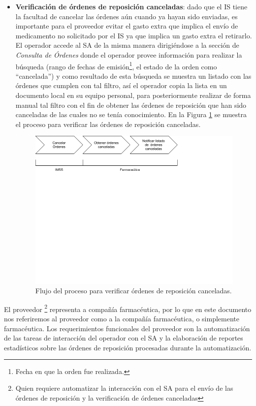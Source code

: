 \documentclass[letterpaper,11pt]{article}
\begin{document}
\begin{itemize}
\item \textbf{Verificación de órdenes de reposición canceladas}: dado que el IS tiene la facultad de cancelar las órdenes aún cuando ya hayan sido enviadas, es importante para el proveedor evitar el gasto extra que implica el envío de medicamento no solicitado por el IS ya que implica un gasto extra el retirarlo. El operador accede al SA de la misma manera dirigiéndose a la sección de \textit{Consulta de Órdenes} donde el operador provee información para realizar la búsqueda (rango de fechas de emisión\footnote{Fecha en que la orden fue realizada.}, el estado de la orden como ``cancelada'') y como resultado de esta búsqueda se muestra un listado con las órdenes que cumplen con tal filtro, así el operador copia la lista en un documento local en su equipo personal, para posteriormente realizar de forma manual tal filtro con el fin de obtener las órdenes de reposición que han sido canceladas de las cuales no se tenía conocimiento. En la Figura \ref{fig:flow-proc-verificar} se muestra el proceso para verificar las órdenes de reposición canceladas.
\begin{figure}[h]
\centering
\includegraphics[scale=0.3]{flujo-proceso-verificar} 
\caption{Flujo del proceso para verificar órdenes de reposición canceladas.}
\label{fig:flow-proc-verificar}
\end{figure}
\end{itemize}

El proveedor \footnote{Quien requiere automatizar la interacción con el SA para el envío de las órdenes de reposición y la verificación de órdenes canceladas} representa a compañía farmacéutica, por lo que en este documento nos referiremos al proveedor como a la compañía farmacéutica, o simplemente farmacéutica. Los requerimientos funcionales del proveedor son la automatización de las tareas de interacción del operador con el SA y la elaboración de reportes estadísticos sobre las órdenes de reposición procesadas durante la automatización.
\end{document}
